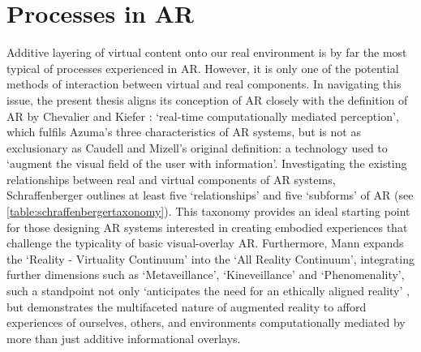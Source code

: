 \section{Processes in AR}\label{sec: ar-process}
Additive layering of virtual content onto our real environment is by far the most typical of processes experienced in AR. However, it is only one of the potential methods of interaction between virtual and real components. In navigating this issue, the present thesis aligns its conception of AR closely with the definition of AR by Chevalier and Kiefer \citeyearpar{chevalier2020}: `real-time computationally mediated perception', which fulfils Azuma's three characteristics of AR systems, but is not as exclusionary as Caudell and Mizell's original definition: a technology used to  `augment the visual field of the user with information'. Investigating the existing relationships between real and virtual components of AR systems, Schraffenberger outlines at least five `relationships' and five `subforms' of AR (see \autoref{table:schraffenbergertaxonomy}). This taxonomy \citeyearpar[pp. 80-130]{schraffenberger2018} provides an ideal starting point for those designing AR systems interested in creating embodied experiences that challenge the typicality of basic visual-overlay AR. Furthermore, Mann expands the `Reality - Virtuality Continuum' \citep{milgram1994} into the `All Reality Continuum', integrating further dimensions such as `Metaveillance', `Kineveillance' and `Phenomenality', such a standpoint not only `anticipates the need for an ethically aligned reality' \citeyearpar{mann2018}, but demonstrates the multifaceted nature of augmented reality to afford experiences of ourselves, others, and environments computationally mediated by more than just additive informational overlays.

